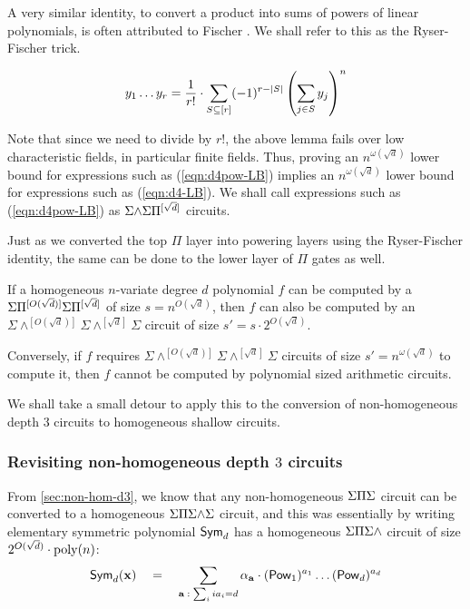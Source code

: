 A very similar identity, to convert a product into sums of powers of
linear polynomials, is often attributed to Fischer \cite{fischer}.
We shall refer to this as the Ryser-Fischer trick. 

\begin{lemma}\label{lem:ryser-fischer}
$$y_1 \dots y_r  = \frac{1}{r!} \cdot \sum_{S\subseteq [r]} (-1)^{r- |S|} \left(\sum_{j\in S} y_j\right)^n$$
\end{lemma}

Note that since we need to divide by $r!$, the above lemma fails over
low characteristic fields, in particular finite fields.
Thus, proving an $n^{\omega(\sqrt{d})}$ lower bound for expressions
such as (\ref{eqn:d4pow-LB}) implies an $n^{\omega(\sqrt{d})}$ lower
bound for expressions such as (\ref{eqn:d4-LB}).
We shall call expressions such as (\ref{eqn:d4pow-LB}) as
$\Sigma\mathord{\wedge}\Sigma\Pi^{[\sqrt{d}]}$ circuits. 

Just as we converted the top $\Pi$ layer into powering layers using
the Ryser-Fischer identity, the same can be done to the lower layer of
$\Pi$ gates as well.

\begin{corollary}\label{cor:pow-genckt}
  If a homogeneous $n$-variate degree $d$ polynomial $f$ can be
  computed by a $\Sigma\Pi^{[O(\sqrt{d})]}\Sigma\Pi^{[\sqrt{d}]}$ of size $s =
  n^{O(\sqrt{d})}$, then $f$ can also be computed by an
  $\Sigma\mathord{\wedge^{[O(\sqrt{d})]}}\Sigma\mathord{\wedge^{[\sqrt{d}]}}\Sigma$
  circuit of size $s' = s \cdot 2^{O(\sqrt{d})}$. 

  Conversely, if $f$ requires
  $\Sigma\mathord{\wedge^{[O(\sqrt{d})]}}\Sigma\mathord{\wedge^{[\sqrt{d}]}}\Sigma$
  circuits of size $s' = n^{\omega(\sqrt{d})}$ to compute it, then $f$
  cannot be computed by polynomial sized arithmetic circuits. 
\end{corollary}

We shall take a small detour to apply this to the conversion of non-homogeneous depth $3$
circuits  to homogeneous shallow circuits.

\subsubsection{Revisiting non-homogeneous depth $3$ circuits}

From \autoref{sec:non-hom-d3}, we know that any non-homogeneous $\Sigma\Pi\Sigma$
circuit can be converted to a homogeneous $\Sigma\Pi\Sigma\mathord{\wedge}\Sigma$ circuit, and
this was essentially by writing elementary symmetric polynomial
$\operatorname{\mathsf{Sym}}_d$ has a homogeneous $\Sigma\Pi\Sigma\mathord{\wedge}$ circuit of size $2^{O(\sqrt{d})}
\cdot \operatorname{poly}(n)$:
\[
\operatorname{\mathsf{Sym}}_d(\mathbf{x}) \quad = \quad \sum_{\mathbf{a}\;:\; \sum_i ia_i = d} \alpha_{\mathbf{a}} \cdot (\operatorname{\mathsf{Pow}}_1)^{a_1}\dots (\operatorname{\mathsf{Pow}}_d)^{a_d}
\]

